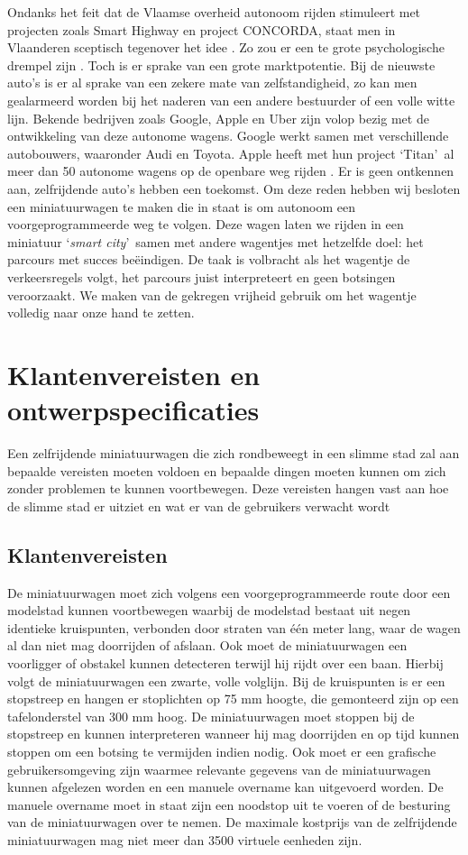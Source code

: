\documentclass[a4paper,kulak]{kulakarticle}
\begin{document}
Ondanks het feit dat de Vlaamse overheid autonoom rijden stimuleert met projecten zoals Smart Highway en project CONCORDA, staat men in Vlaanderen sceptisch tegenover het idee \cite{vbn}. Zo zou er een te grote psychologische drempel zijn \cite{scept}. Toch is er sprake van een grote marktpotentie. Bij de nieuwste auto's is er al sprake van een zekere mate van zelfstandigheid, zo kan men gealarmeerd worden bij het naderen van een andere bestuurder of een volle witte lijn. Bekende bedrijven zoals Google, Apple en Uber zijn volop bezig met de ontwikkeling van deze autonome wagens. Google werkt samen met verschillende autobouwers, waaronder Audi en Toyota. Apple heeft met hun project \lq Titan\rq\ al meer dan 50 autonome wagens op de openbare weg rijden \cite{bedrijven}. Er is geen ontkennen aan, zelfrijdende auto's hebben een toekomst. Om deze reden hebben wij besloten een miniatuurwagen te maken die in staat is om autonoom een voorgeprogrammeerde weg te volgen. Deze wagen laten we rijden in een miniatuur \lq \textit{smart city}\rq\ samen met andere wagentjes met hetzelfde doel: het parcours met succes beëindigen. De taak is volbracht als het wagentje de verkeersregels volgt, het parcours juist interpreteert en geen botsingen veroorzaakt. We maken van de gekregen vrijheid gebruik om het wagentje volledig naar onze hand te zetten.

\section{Klantenvereisten en ontwerpspecificaties}
Een zelfrijdende miniatuurwagen die zich rondbeweegt in een slimme stad zal aan bepaalde vereisten moeten voldoen en bepaalde dingen moeten kunnen om zich zonder problemen te kunnen voortbewegen. Deze vereisten hangen vast aan hoe de slimme stad er uitziet en wat er van de gebruikers verwacht wordt


\subsection{Klantenvereisten}
De miniatuurwagen moet zich volgens een voorgeprogrammeerde route door een modelstad kunnen voortbewegen waarbij de modelstad bestaat uit negen identieke kruispunten, verbonden door straten van één meter lang, waar de wagen al dan niet mag doorrijden of afslaan. Ook moet de miniatuurwagen een voorligger of obstakel kunnen detecteren terwijl hij rijdt over een baan. Hierbij volgt de miniatuurwagen een zwarte, volle volglijn. Bij de kruispunten is er een stopstreep en hangen er stoplichten op 75 mm hoogte, die gemonteerd zijn op een tafelonderstel van 300 mm hoog. De miniatuurwagen moet stoppen bij de stopstreep en kunnen interpreteren wanneer hij mag doorrijden en op tijd kunnen stoppen om een botsing te vermijden indien nodig. Ook moet er een grafische gebruikersomgeving zijn waarmee relevante gegevens van de miniatuurwagen kunnen afgelezen worden en een manuele overname kan uitgevoerd worden. De manuele overname moet in staat zijn een noodstop uit te voeren of de besturing van de miniatuurwagen over te nemen. De maximale kostprijs van de zelfrijdende miniatuurwagen mag niet meer dan 3500 virtuele eenheden zijn.
\end{document}

